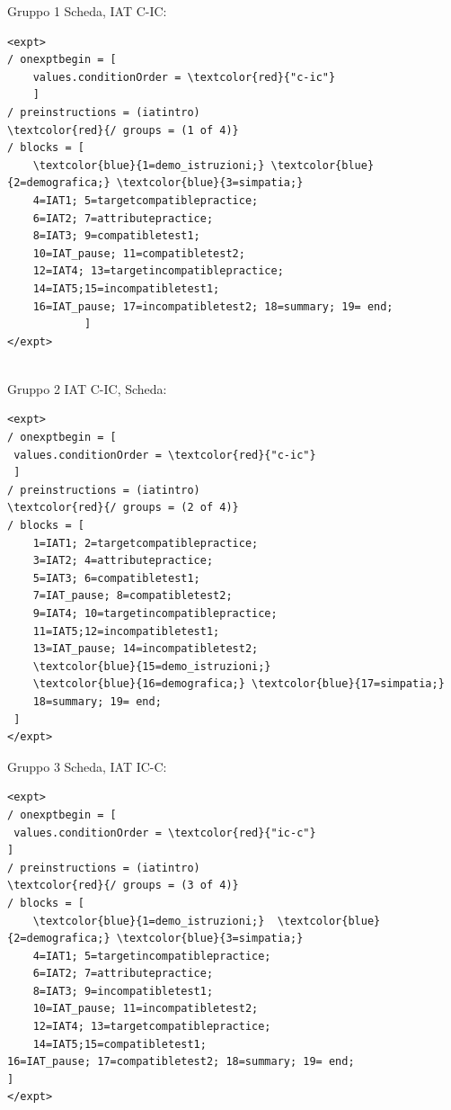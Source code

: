 \documentclass{beamer}
\begin{document}
\begin{frame}[fragile]{Gruppo 1}
	Scheda, IAT C-IC:
	\begin{footnotesize}
		\begin{Verbatim}[commandchars=\\\{\}]
<expt>
/ onexptbegin = [
	values.conditionOrder = \textcolor{red}{"c-ic"}
	]
/ preinstructions = (iatintro)
\textcolor{red}{/ groups = (1 of 4)}
/ blocks = [
	\textcolor{blue}{1=demo_istruzioni;} \textcolor{blue}{2=demografica;} \textcolor{blue}{3=simpatia;}
	4=IAT1; 5=targetcompatiblepractice; 
	6=IAT2; 7=attributepractice; 
	8=IAT3; 9=compatibletest1; 
	10=IAT_pause; 11=compatibletest2; 
	12=IAT4; 13=targetincompatiblepractice; 
	14=IAT5;15=incompatibletest1; 
	16=IAT_pause; 17=incompatibletest2; 18=summary; 19= end;
			]
</expt>
			
		\end{Verbatim}
	\end{footnotesize}

\end{frame}


\begin{frame}[fragile]{Gruppo 2}
	IAT C-IC, Scheda:
	\begin{footnotesize}
		\begin{Verbatim}[commandchars=\\\{\}]
<expt>
/ onexptbegin = [
 values.conditionOrder = \textcolor{red}{"c-ic"}
 ]
/ preinstructions = (iatintro)
\textcolor{red}{/ groups = (2 of 4)}
/ blocks = [
	1=IAT1; 2=targetcompatiblepractice; 
	3=IAT2; 4=attributepractice;  
	5=IAT3; 6=compatibletest1; 
	7=IAT_pause; 8=compatibletest2; 
	9=IAT4; 10=targetincompatiblepractice; 
	11=IAT5;12=incompatibletest1; 
	13=IAT_pause; 14=incompatibletest2; 		
	\textcolor{blue}{15=demo_istruzioni;} 
	\textcolor{blue}{16=demografica;} \textcolor{blue}{17=simpatia;}
	18=summary; 19= end;
 ]
</expt>			
		\end{Verbatim}
	\end{footnotesize}
	
\end{frame}

\begin{frame}[fragile]{Gruppo 3}
	Scheda, IAT IC-C:
	\begin{footnotesize}
		\begin{Verbatim}[commandchars=\\\{\}]
<expt>
/ onexptbegin = [
 values.conditionOrder = \textcolor{red}{"ic-c"}
]
/ preinstructions = (iatintro)
\textcolor{red}{/ groups = (3 of 4)}
/ blocks = [
	\textcolor{blue}{1=demo_istruzioni;}  \textcolor{blue}{2=demografica;} \textcolor{blue}{3=simpatia;}
	4=IAT1; 5=targetincompatiblepractice; 
	6=IAT2; 7=attributepractice; 
	8=IAT3; 9=incompatibletest1; 
	10=IAT_pause; 11=incompatibletest2; 
	12=IAT4; 13=targetcompatiblepractice; 
	14=IAT5;15=compatibletest1; 
16=IAT_pause; 17=compatibletest2; 18=summary; 19= end;
]
</expt>
		\end{Verbatim}
	\end{footnotesize}
	
\end{frame}
\end{document}
